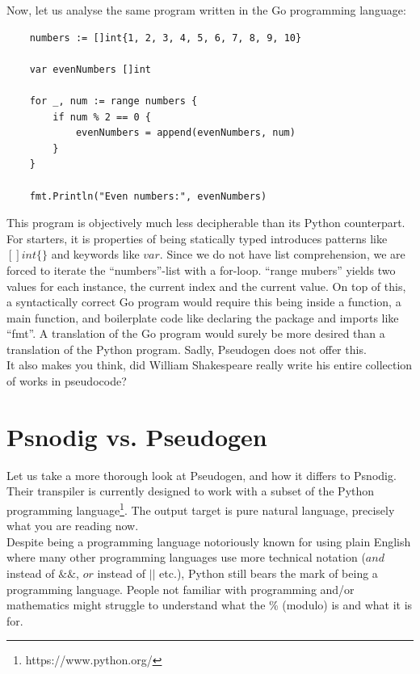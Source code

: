 Now, let us analyse the same program written in the Go programming language:

\begin{verbatim}
    numbers := []int{1, 2, 3, 4, 5, 6, 7, 8, 9, 10}

    var evenNumbers []int

    for _, num := range numbers {
        if num % 2 == 0 {
            evenNumbers = append(evenNumbers, num)
        }
    }

    fmt.Println("Even numbers:", evenNumbers)
\end{verbatim}

This program is objectively much less decipherable than its Python counterpart. For starters, it is properties of being statically typed introduces patterns like $[]int\{\}$ and keywords like $var$. Since we do not have list comprehension, we are forced to iterate the ``numbers''-list with a for-loop. ``range mubers'' yields two values for each instance, the current index and the current value. On top of this, a syntactically correct Go program would require this being inside a function, a main function, and boilerplate code like declaring the package and imports like ``fmt''. A translation of the Go program would surely be more desired than a translation of the Python program. Sadly, Pseudogen does not offer this. \hfill \\

It also makes you think, did William Shakespeare really write his entire collection of works in pseudocode?

\section{Psnodig vs. Pseudogen}

Let us take a more thorough look at Pseudogen, and how it differs to Psnodig. Their transpiler is currently designed to work with a subset of the Python programming language\footnote{https://www.python.org/}. The output target is pure natural language, precisely what you are reading now. \hfill \\

Despite being a programming language notoriously known for using plain English where many other programming languages use more technical notation ($and$ instead of $\&\&$, $or$ instead of $||$ etc.), Python still bears the mark of being a programming language. People not familiar with programming and/or mathematics might struggle to understand what the \% (modulo) is and what it is for. \hfill \\

